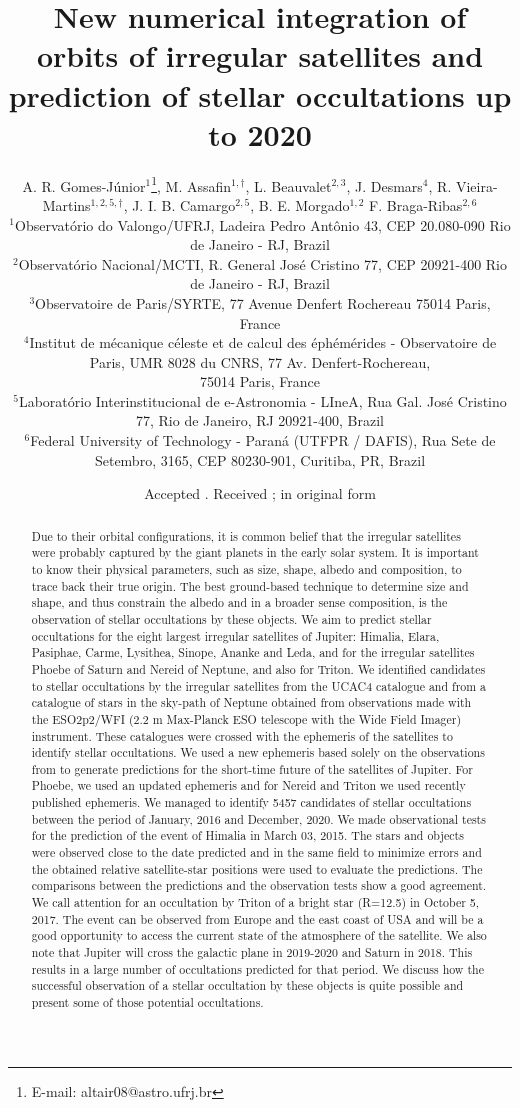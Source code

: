 \documentclass[useAMS,usenatbib]{mn2e}
\title[New orbits and predictions of stellar occultations by irregular satellites up to 2020]{New numerical integration of orbits of irregular satellites and prediction of stellar occultations up to 2020}
\author[A. R. Gomes-J\'unior, M. Assafin, L. Beauvalet et al.]{A. R. Gomes-J\'unior$^{1}$\thanks{E-mail: altair08@astro.ufrj.br},
M. Assafin$^{1,\dag}$,
L. Beauvalet$^{2,3}$,
J. Desmars$^{4}$,
R. Vieira-Martins$^{1,2,5,\dag}$,\newauthor
J. I. B. Camargo$^{2,5}$,
B. E. Morgado$^{1,2}$
F. Braga-Ribas$^{2,6}$
\\
$^{1}$Observat\'orio do Valongo/UFRJ, Ladeira Pedro Ant\^onio 43,
CEP 20.080-090 Rio de Janeiro - RJ, Brazil\\
$^{2}$Observat\'orio Nacional/MCTI, R. General Jos\'e Cristino 77, CEP 20921-400 Rio de Janeiro - RJ, Brazil\\
$^{3}$Observatoire de Paris/SYRTE, 77 Avenue Denfert Rochereau 75014 Paris, France\\
$^{4}$Institut de m\'ecanique c\'eleste et de calcul des \'eph\'em\'erides - Observatoire de Paris, UMR 8028 du CNRS, 77 Av. Denfert-Rochereau,\\ 75014 Paris, France\\
$^{5}$Laborat\'orio Interinstitucional de e-Astronomia - LIneA, Rua Gal. Jos\'e Cristino 77, Rio de Janeiro, RJ 20921-400, Brazil\\
$^{6}$Federal University of Technology - Paran\'a (UTFPR / DAFIS), Rua Sete de Setembro, 3165, CEP 80230-901, Curitiba, PR, Brazil
}
\begin{document}
\newcommand{\noccs}{5457 } %

\date{Accepted . Received ; in original form }

\pagerange{\pageref{firstpage}--\pageref{lastpage}} 

\maketitle

\label{firstpage}

\begin{abstract}
Due to their orbital configurations, it is common belief that the irregular satellites were probably captured by the giant planets in the early solar system. It is important to know their physical parameters, such as size, shape, albedo and composition, to trace back their true origin. The best ground-based technique to determine size and shape, and thus constrain the albedo and in a broader sense composition, is the observation of stellar occultations by these objects.
We aim to predict stellar occultations for the eight largest irregular satellites of Jupiter: Himalia, Elara, Pasiphae, Carme, Lysithea, Sinope, Ananke and Leda, and for the irregular satellites Phoebe of Saturn and Nereid of Neptune, and also for Triton.
We identified candidates to stellar occultations by the irregular satellites from the UCAC4 catalogue and from a catalogue of stars in the sky-path of Neptune obtained from observations made with the ESO2p2/WFI (2.2 m Max-Planck ESO telescope with the Wide Field Imager) instrument. These catalogues were crossed with the ephemeris of the satellites to identify stellar occultations. We used a new ephemeris based solely on the observations from \cite{GomesJunior2015} to generate predictions for the short-time future of the satellites of Jupiter. For Phoebe, we used an updated ephemeris and for Nereid and Triton we used recently published ephemeris.
We managed to identify \noccs candidates of stellar occultations between the period of January, 2016 and December, 2020. We made observational tests for the prediction of the event of Himalia in March 03, 2015. The stars and objects were observed close to the date predicted and in the same field to minimize errors and the obtained relative satellite-star positions were used to evaluate the predictions. The comparisons between the predictions and the observation tests show a good agreement. We call attention for an occultation by Triton of a bright star (R=12.5) in October 5, 2017. The event can be observed from Europe and the east coast of USA and will be a good opportunity to access the current state of the atmosphere of the satellite. We also note that Jupiter will cross the galactic plane in 2019-2020 and Saturn in 2018. This results in a large number of occultations predicted for that period.
We discuss how the successful observation of a stellar occultation by these objects is quite possible and present some of those potential occultations.
\end{abstract}
\end{document}
